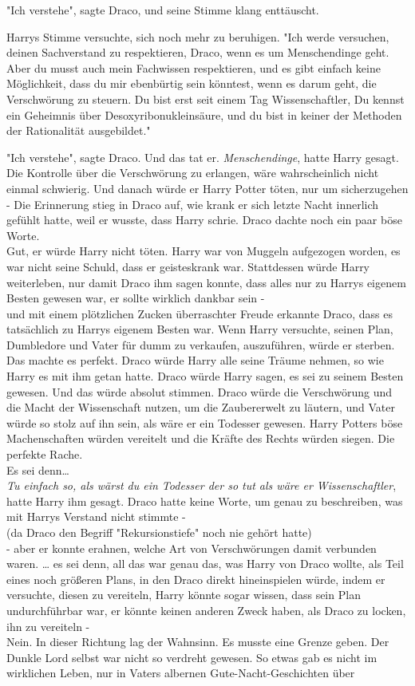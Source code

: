 {"Ich verstehe", sagte Draco, und seine Stimme klang enttäuscht.

Harrys Stimme versuchte, sich noch mehr zu beruhigen. "Ich werde versuchen, deinen Sachverstand zu respektieren, Draco, wenn es um Menschendinge geht. Aber du musst auch mein Fachwissen respektieren, und es gibt einfach keine Möglichkeit, dass du mir ebenbürtig sein könntest, wenn es darum geht, die Verschwörung zu steuern. Du bist erst seit einem Tag Wissenschaftler, Du kennst ein Geheimnis über Desoxyribonukleinsäure, und du bist in keiner der Methoden der Rationalität ausgebildet."

"Ich verstehe", sagte Draco. Und das tat er. \emph{Menschendinge}, hatte Harry gesagt. Die Kontrolle über die Verschwörung zu erlangen, wäre wahrscheinlich nicht einmal schwierig. Und danach würde er Harry Potter töten, nur um sicherzugehen - Die Erinnerung stieg in Draco auf, wie krank er sich letzte Nacht innerlich gefühlt hatte, weil er wusste, dass Harry schrie. Draco dachte noch ein paar böse Worte.\\ Gut, er würde Harry nicht töten. Harry war von Muggeln aufgezogen worden, es war nicht seine Schuld, dass er geisteskrank war. Stattdessen würde Harry weiterleben, nur damit Draco ihm sagen konnte, dass alles nur zu Harrys eigenem Besten gewesen war, er sollte wirklich dankbar sein -\\ und mit einem plötzlichen Zucken überraschter Freude erkannte Draco, dass es tatsächlich zu Harrys eigenem Besten war. Wenn Harry versuchte, seinen Plan, Dumbledore und Vater für dumm zu verkaufen, auszuführen, würde er sterben. Das machte es perfekt. Draco würde Harry alle seine Träume nehmen, so wie Harry es mit ihm getan hatte. Draco würde Harry sagen, es sei zu seinem Besten gewesen. Und das würde absolut stimmen. Draco würde die Verschwörung und die Macht der Wissenschaft nutzen, um die Zaubererwelt zu läutern, und Vater würde so stolz auf ihn sein, als wäre er ein Todesser gewesen. Harry Potters böse Machenschaften würden vereitelt und die Kräfte des Rechts würden siegen. Die perfekte Rache.\\ Es sei denn…\\ \emph{Tu einfach so, als wärst du ein Todesser der so tut als wäre er Wissenschaftler},\\ hatte Harry ihm gesagt. Draco hatte keine Worte, um genau zu beschreiben, was mit Harrys Verstand nicht stimmte -\\ (da Draco den Begriff "Rekursionstiefe" noch nie gehört hatte)\\ - aber er konnte erahnen, welche Art von Verschwörungen damit verbunden waren. … es sei denn, all das war genau das, was Harry von Draco wollte, als Teil eines noch größeren Plans, in den Draco direkt hineinspielen würde, indem er versuchte, diesen zu vereiteln, Harry könnte sogar wissen, dass sein Plan undurchführbar war, er könnte keinen anderen Zweck haben, als Draco zu locken, ihn zu vereiteln -\\ Nein. In dieser Richtung lag der Wahnsinn. Es musste eine Grenze geben. Der Dunkle Lord selbst war nicht so verdreht gewesen. So etwas gab es nicht im wirklichen Leben, nur in Vaters albernen Gute-Nacht-Geschichten über }

